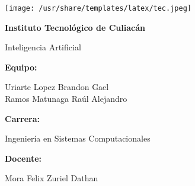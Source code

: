 \documentclass[14pt]{extarticle}
\begin{document}
  
  \thispagestyle{empty}

  \texttt{[image: /usr/share/templates/latex/tec.jpeg]}

  \begin{center}
    {\LARGE \textbf{Instituto Tecnológico de Culiacán}}

    \vspace{1cm}
    {\Large Inteligencia Artificial}

    \vspace{4cm}
    {\large \textbf{Equipo:}}

    \vspace{0.3cm}
    {\large
      Uriarte Lopez Brandon Gael\\\vspace{0.3cm}
      Ramos Matunaga Raúl Alejandro
    }

    \vspace{2cm}
    {\large \textbf{Carrera:}}

    \vspace{0.3cm}
    {\large Ingeniería en Sistemas Computacionales}

    \vspace{2cm}
    {\large \textbf{Docente:}}

    \vspace{0.3cm}
    {\large Mora Felix Zuriel Dathan}
  \end{center}
\end{document}
